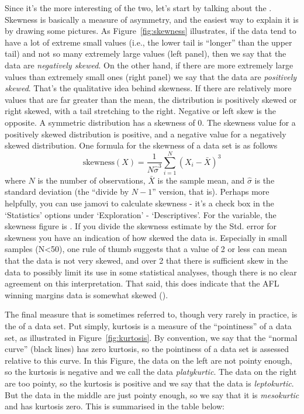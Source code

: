 Since it's the more interesting of the two, let's start by talking about the . Skewness is basically a measure of asymmetry, and the easiest way to explain it is by drawing some pictures. As Figure~\ref{fig:skewness} illustrates, if the data tend to have a lot of extreme small values (i.e., the lower tail is ``longer'' than the upper tail) and not so many extremely large values (left panel), then we say that the data are {\it negatively skewed}. On the other hand, if there are more extremely large values than extremely small ones (right panel) we say that the data are {\it positively skewed}. That's the qualitative idea behind skewness. If there are relatively more values that are far greater than the mean, the distribution is positively skewed or right skewed, with a tail stretching to the right.  Negative or left skew is the opposite. A symmetric distribution has a skewness of 0.  The skewness value for a positively skewed distribution is positive, and a negative value for a negatively skewed distribution. One formula for the skewness of a data set is as follows
$$
\mbox{skewness}(X) = \frac{1}{N \hat{\sigma}^3} \sum_{i=1}^N (X_i - \bar{X})^3
$$
where $N$ is the number of observations, $\bar{X}$ is the sample mean, and $\hat{\sigma}$ is the standard deviation (the ``divide by $N-1$'' version, that is). Perhaps more helpfully, you can use jamovi to calculate skewness - it's a check box in the `Statistics' options under `Exploration' - `Descriptives'. For the  variable, the skewness figure is . If you divide the skewness estimate by the Std. error for skewness you have an indication of how skewed the data is. Especially in small samples (N<50), one rule of thumb suggests that a value of 2 or less can mean that the data is not very skewed, and over 2 that there is sufficient skew in the data to possibly limit its use in some statistical analyses, though there is no clear agreement on this interpretation. That said, this does indicate that the AFL winning margins data is somewhat skewed (). 

The final measure that is sometimes referred to, though very rarely in practice, is the  of a data set. Put simply, kurtosis is a measure of the ``pointiness'' of a data set, as illustrated in Figure~\ref{fig:kurtosis}. By convention, we say that the ``normal curve'' (black lines) has zero kurtosis, so the pointiness of a data set is assessed relative to this curve. In this Figure, the data on the left are not pointy enough, so the kurtosis is negative and we call the data {\it platykurtic}. The data on the right are too pointy, so the kurtosis is positive and we say that the data is {\it leptokurtic}. But the data in the middle are just pointy enough, so we say that it is {\it mesokurtic} and has kurtosis zero. This is summarised in the table below:

